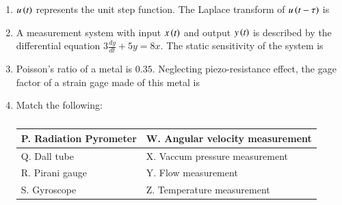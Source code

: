 \documentclass[journal,12pt,onecolumn]{IEEEtran}
\theoremstyle{remark}
\begin{document}
\begin{enumerate}
\item $u\left(t\right)$ represents the unit step function. The Laplace transform of $u\left(t - \tau\right)$ is

\hfill{}
\begin{enumerate}
\end{enumerate}

\item A measurement system with input $x\left(t\right)$ and output $y\left(t\right)$ is described by the differential equation $3\frac{dy}{dt} + 5y = 8x$. The static sensitivity of the system is

\hfill{}
\begin{enumerate}
\end{enumerate}

\item Poisson's ratio of a metal is $0.35$. Neglecting piezo-resistance effect, the gage factor of a strain gage made of this metal is

\hfill{}
\begin{enumerate}
\end{enumerate}

\item Match the following:
\begin{table}[H]
    \centering\normalsize
    \begin{tabular}{|m{18em}|m{18em}|}
    \hline
        P. Radiation Pyrometer & W. Angular velocity measurement  \\
    \hline
        Q. Dall tube & X. Vaccum pressure measurement \\
    \hline
        R. Pirani gauge & Y. Flow measurement \\
    \hline
        S. Gyroscope & Z. Temperature measurement \\
        \hline
    \end{tabular}
    \caption*{}
    \label{tab:Q7}
\end{table}


\end{enumerate}
\end{document}
